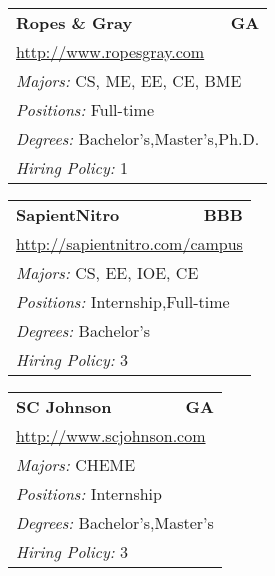 \documentclass[twoside]{article}
\begin{document}
\begin{center}
\begin{multicols}{3}
\begin{FlushLeft}
\begin{minipage}{.9\columnwidth}
\end{minipage}
 
\begin{minipage}{.9\columnwidth}\begin{tabularx}{.95\columnwidth}{Xr}
                 {\Large\bf Ropes \& Gray} & {\Large\bf GA}\\
    \multicolumn{2}{p{.95\columnwidth}}{\url{http://www.ropesgray.com}}\\
    \multicolumn{2}{p{.95\columnwidth}}{\emph{Majors:} CS, ME, EE, CE, BME}\\
    \multicolumn{2}{p{.95\columnwidth}}{\emph{Positions:} Full-time}\\
    \multicolumn{2}{p{.95\columnwidth}}{\emph{Degrees:} Bachelor's,Master's,Ph.D.}\\
    \multicolumn{2}{p{.95\columnwidth}}{\emph{Hiring Policy:} 1}\\
    \end{tabularx}
    
\end{minipage}
 
\begin{minipage}{.9\columnwidth}\begin{tabularx}{.95\columnwidth}{Xr}
                 {\Large\bf SapientNitro} & {\Large\bf BBB}\\
    \multicolumn{2}{p{.95\columnwidth}}{\url{http://sapientnitro.com/campus}}\\
    \multicolumn{2}{p{.95\columnwidth}}{\emph{Majors:} CS, EE, IOE, CE}\\
    \multicolumn{2}{p{.95\columnwidth}}{\emph{Positions:} Internship,Full-time}\\
    \multicolumn{2}{p{.95\columnwidth}}{\emph{Degrees:} Bachelor's}\\
    \multicolumn{2}{p{.95\columnwidth}}{\emph{Hiring Policy:} 3}\\
    \end{tabularx}
    
\end{minipage}
 
\begin{minipage}{.9\columnwidth}\begin{tabularx}{.95\columnwidth}{Xr}
                 {\Large\bf SC Johnson} & {\Large\bf GA}\\
    \multicolumn{2}{p{.95\columnwidth}}{\url{http://www.scjohnson.com}}\\
    \multicolumn{2}{p{.95\columnwidth}}{\emph{Majors:} CHEME}\\
    \multicolumn{2}{p{.95\columnwidth}}{\emph{Positions:} Internship}\\
    \multicolumn{2}{p{.95\columnwidth}}{\emph{Degrees:} Bachelor's,Master's}\\
    \multicolumn{2}{p{.95\columnwidth}}{\emph{Hiring Policy:} 3}\\
    \end{tabularx}
    

\end{minipage}
\end{FlushLeft}
\end{multicols}
\end{center}
\end{document}
